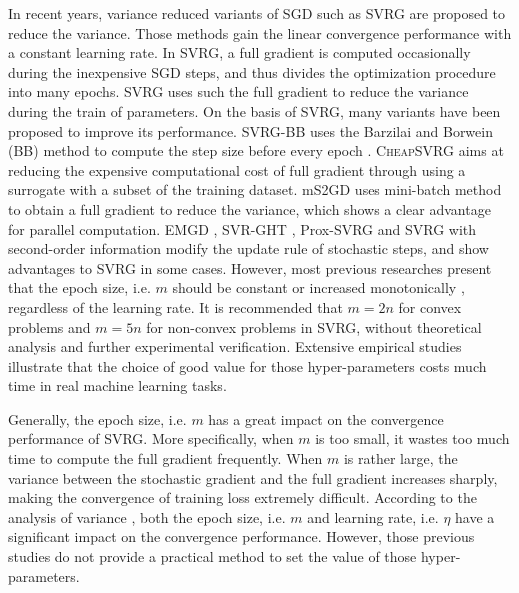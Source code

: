 \documentclass[conference]{IEEEtran}
\begin{document}
In recent years, variance reduced variants of SGD such as SVRG \citep{Johnson:9MAvkbgy} are proposed to reduce the variance. Those methods gain the linear convergence performance with a constant learning rate. In SVRG, a full gradient is computed occasionally during the inexpensive SGD steps, and thus divides the optimization procedure into many epochs. SVRG uses such the full gradient to reduce the variance during the train of parameters. On the basis of SVRG, many variants have been proposed to improve its performance.
SVRG-BB \citep{Tan2016Barzilai} uses the Barzilai and Borwein (BB) method   to compute the step size before every epoch \citep{Barzilai1988Two}. 
\textsc{CheapSVRG} \citep{Shah2016Trading}  aims at reducing the expensive computational cost of full gradient  through using a surrogate with a subset of the training dataset. 
mS2GD \citep{Liu:2015bx} uses mini-batch method to obtain a full gradient to reduce the variance, which shows a clear advantage for  parallel computation.  EMGD \citep{Zhang2013Linear}, SVR-GHT \citep{Li:2016vh}, Prox-SVRG \citep{Xiao:2014vw} and SVRG with second-order information \citep{KolteAccelerating} modify the update rule of stochastic steps, and show advantages to SVRG in some cases.  However,  most previous researches present that the epoch size, i.e. $m$ should be constant \citep{Johnson:9MAvkbgy, Tan2016Barzilai, Shah2016Trading} or increased monotonically \citep{Liu:2015bx},  regardless of the learning rate. It is recommended that $m = 2n$ for convex problems and $m = 5n$ for non-convex problems in SVRG, without theoretical analysis and further experimental verification. Extensive empirical studies illustrate that the choice of good value for those hyper-parameters costs much time in real machine learning tasks.  

Generally, the epoch size, i.e. $m$ has a great impact on the convergence performance of SVRG.  More specifically, when $m$ is too small, it wastes too much time to compute the full gradient frequently. When $m$ is rather large, the variance between the stochastic gradient and the full gradient increases sharply, making the convergence of training loss extremely difficult. According to the analysis of variance \cite{AllenZhu:2016up}, both the epoch size, i.e. $m$ and learning rate, i.e. $\eta$ have a significant impact on the convergence performance.  However, those previous studies do not provide a practical method to set the value of those hyper-parameters. 
\end{document}
